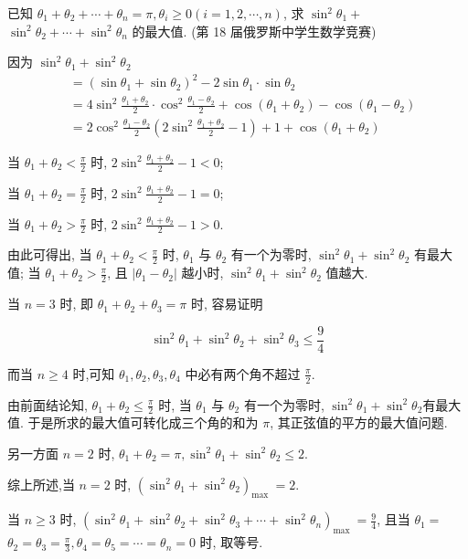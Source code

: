 \begin{example}
	已知 $\theta_{1}+\theta_{2}+\cdots+\theta_{n}=\pi, \theta_{i} \geqslant 0(i=1,2, \cdots, n)$, 求 $\sin ^{2} \theta_{1}+$ $\sin ^{2} \theta_{2}+\cdots+\sin ^{2} \theta_{n}$ 的最大值. (第 18 届俄罗斯中学生数学竞赛)
\end{example}
\begin{solution}
	因为 $\sin ^{2} \theta_{1}+\sin ^{2} \theta_{2}$
	$$
		\begin{aligned}
			 & =\left(\sin \theta_{1}+\sin \theta_{2}\right)^{2}-2 \sin \theta_{1} \cdot \sin \theta_{2}                                                                                    \\
			 & =4 \sin ^{2} \frac{\theta_{1}+\theta_{2}}{2} \cdot \cos ^{2} \frac{\theta_{1}-\theta_{2}}{2}+\cos \left(\theta_{1}+\theta_{2}\right)-\cos \left(\theta_{1}-\theta_{2}\right) \\
			 & =2 \cos ^{2} \frac{\theta_{1}-\theta_{2}}{2}\left(2 \sin ^{2} \frac{\theta_{1}+\theta_{2}}{2}-1\right)+1+\cos \left(\theta_{1}+\theta_{2}\right)
		\end{aligned}
	$$

	当 $\theta_{1}+\theta_{2}<\frac{\pi}{2}$ 时, $2 \sin ^{2} \frac{\theta_{1}+\theta_{2}}{2}-1<0$;

	当 $\theta_{1}+\theta_{2}=\frac{\pi}{2}$ 时, $2 \sin ^{2} \frac{\theta_{1}+\theta_{2}}{2}-1=0$;

	当 $\theta_{1}+\theta_{2}>\frac{\pi}{2}$ 时, $2 \sin ^{2} \frac{\theta_{1}+\theta_{2}}{2}-1>0$.

	由此可得出, 当 $\theta_{1}+\theta_{2}<\frac{\pi}{2}$ 时, $\theta_{1}$ 与 $\theta_{2}$ 有一个为零时, $\sin ^{2} \theta_{1}+\sin ^{2} \theta_{2}$ 有最大值; 当 $\theta_{1}+\theta_{2}>\frac{\pi}{2}$, 且 $\left|\theta_{1}-\theta_{2}\right|$ 越小时, $\sin ^{2} \theta_{1}+\sin ^{2} \theta_{2}$ 值越大.

	当 $n=3$ 时, 即 $\theta_{1}+\theta_{2}+\theta_{3}=\pi$ 时, 容易证明

	$$
		\sin ^{2} \theta_{1}+\sin ^{2} \theta_{2}+\sin ^{2} \theta_{3} \leqslant \frac{9}{4}
	$$

	而当 $n \geqslant 4$ 时,可知 $\theta_{1} ,  \theta_{2} ,  \theta_{3} ,  \theta_{4}$ 中必有两个角不超过 $\frac{\pi}{2}$.

	由前面结论知, $\theta_{1}+\theta_{2} \leqslant \frac{\pi}{2}$ 时, 当 $\theta_{1}$ 与 $\theta_{2}$ 有一个为零时, $\sin ^{2} \theta_{1}+\sin ^{2} \theta_{2}$有最大值. 于是所求的最大值可转化成三个角的和为 $\pi$, 其正弦值的平方的最大值问题.

	另一方面 $n=2$ 时, $\theta_{1}+\theta_{2}=\pi, \sin ^{2} \theta_{1}+\sin ^{2} \theta_{2} \leqslant 2$.

	综上所述,当 $n=2$ 时, $\left(\sin ^{2} \theta_{1}+\sin ^{2} \theta_{2}\right)_{\text {max }}=2$.

	当 $n \geqslant 3$ 时, $\left(\sin ^{2} \theta_{1}+\sin ^{2} \theta_{2}+\sin ^{2} \theta_{3}+\cdots+\sin ^{2} \theta_{n}\right)_{\text {max }}=\frac{9}{4}$, 且当 $\theta_{1}=$ $\theta_{2}=\theta_{3}=\frac{\pi}{3}, \theta_{4}=\theta_{5}=\cdots=\theta_{n}=0$ 时, 取等号.
\end{solution}
